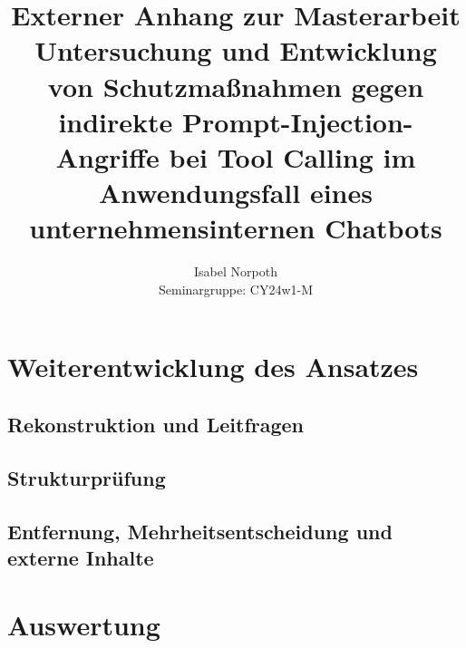 \documentclass[a4paper,11pt]{report}
\title{Externer Anhang zur Masterarbeit\\[1.5em]
	\large Untersuchung und Entwicklung von Schutzmaßnahmen gegen indirekte
	Prompt-Injection-Angriffe bei Tool Calling im Anwendungsfall eines
	unternehmensinternen Chatbots}
\author{Isabel Norpoth\\[0.5em] Seminargruppe: CY24w1-M}
\date{}
\begin{document}
\maketitle
\tableofcontents





\chapter{Weiterentwicklung des Ansatzes}\label{ch:anhang_weiterentwicklung}

\section{Rekonstruktion und Leitfragen}


\section{Strukturprüfung}


\section{Entfernung, Mehrheitsentscheidung und externe Inhalte}


% 

\chapter{Auswertung}\label{ch:anhang_auswertung}
\end{document}
